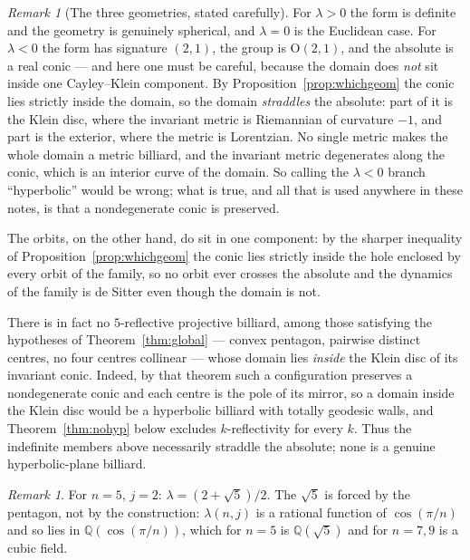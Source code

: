 \documentclass[11pt,a4paper]{article}
\theoremstyle{plain}
\theoremstyle{definition}
\theoremstyle{remark}
\newtheorem{remark}[theorem]{Remark}
\begin{document}
\begin{remark}[The three geometries, stated carefully]\label{rem:geom}
For $\lambda>0$ the form is definite and the geometry is genuinely spherical, and
$\lambda=0$ is the Euclidean case. For $\lambda<0$ the form has signature $(2,1)$,
the group is $\mathrm{O}(2,1)$, and the absolute is a real conic --- and here one
must be careful, because the domain does \emph{not} sit inside one Cayley--Klein
component. By Proposition~\ref{prop:whichgeom} the conic lies strictly inside the
domain, so the domain \emph{straddles} the absolute: part of it is the Klein disc,
where the invariant metric is Riemannian of curvature $-1$, and part is the
exterior, where the metric is Lorentzian. No single metric makes the whole domain a
metric billiard, and the invariant metric degenerates along the conic, which is an
interior curve of the domain. So calling the $\lambda<0$ branch ``hyperbolic''
would be wrong; what is true, and all that is used anywhere in these notes, is that
a nondegenerate conic is preserved.

The orbits, on the other hand, do sit in one component: by the sharper inequality
of Proposition~\ref{prop:whichgeom} the conic lies strictly inside the hole enclosed
by every orbit of the family, so no orbit ever crosses the absolute and the
dynamics of the family is de Sitter even though the domain is not.

There is in fact no $5$-reflective projective billiard, among those
satisfying the hypotheses of Theorem~\ref{thm:global} --- convex pentagon,
pairwise distinct centres, no four centres collinear --- whose domain lies
\emph{inside} the Klein disc of its invariant conic.  Indeed, by that theorem
such a configuration preserves a nondegenerate conic and each centre is the pole
of its mirror, so a domain inside the Klein disc would be a hyperbolic billiard
with totally geodesic walls, and Theorem~\ref{thm:nohyp} below excludes
$k$-reflectivity for every $k$.  Thus the indefinite members above necessarily
straddle the absolute; none is a genuine hyperbolic-plane billiard.
\end{remark}

\begin{remark}
For $n=5$, $j=2$: $\lambda=(2+\sqrt5)/2$. The $\sqrt5$ is forced by the pentagon,
not by the construction: $\lambda(n,j)$ is a rational function of $\cos(\pi/n)$ and
so lies in $\mathbb{Q}(\cos(\pi/n))$, which for $n=5$ is $\mathbb{Q}(\sqrt5)$ and
for $n=7,9$ is a cubic field.
\end{remark}
\end{document}
